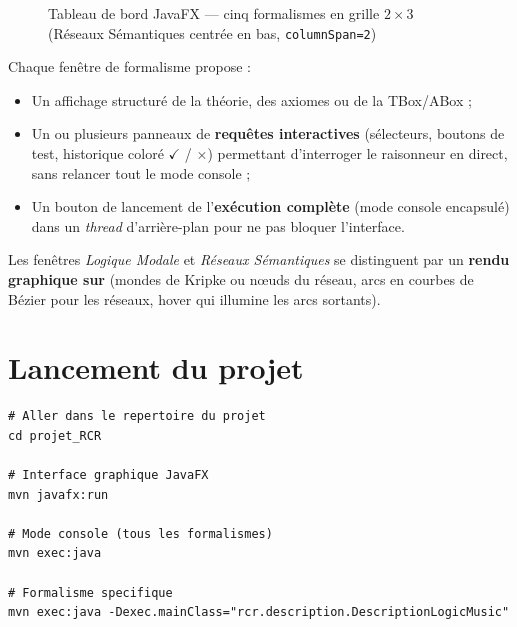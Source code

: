 \begin{figure}[H]
\caption{Tableau de bord JavaFX — cinq formalismes en grille $2\times 3$
(Réseaux Sémantiques centrée en bas, \texttt{columnSpan=2})}
\label{fig:dashboard}
\end{figure}

Chaque fenêtre de formalisme propose :
\begin{itemize}
  \item Un affichage structuré de la théorie, des axiomes ou de la TBox/ABox ;
  \item Un ou plusieurs panneaux de \textbf{requêtes interactives} (sélecteurs,
        boutons de test, historique coloré $\checkmark$ / $\times$) permettant
        d'interroger le raisonneur en direct, sans relancer tout le mode console ;
  \item Un bouton de lancement de l'\textbf{exécution complète} (mode console
        encapsulé) dans un \emph{thread} d'arrière-plan pour ne pas bloquer
        l'interface.
\end{itemize}

\noindent Les fenêtres \emph{Logique Modale} et \emph{Réseaux Sémantiques} se
distinguent par un \textbf{rendu graphique sur } (mondes de Kripke
ou nœuds du réseau, arcs en courbes de Bézier pour les réseaux, hover qui
illumine les arcs sortants).

\section{Lancement du projet}

\begin{lstlisting}[style=dl, caption={Commandes de lancement}]
# Aller dans le repertoire du projet
cd projet_RCR

# Interface graphique JavaFX
mvn javafx:run

# Mode console (tous les formalismes)
mvn exec:java

# Formalisme specifique
mvn exec:java -Dexec.mainClass="rcr.description.DescriptionLogicMusic"
\end{lstlisting}
